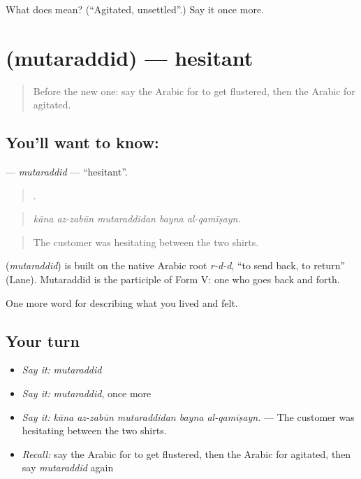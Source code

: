 \begin{tcolorbox}[breakable,colback=teal!4,colframe=teal!35!black,title={Before you move on}]
What does  mean? (\textquotedblleft{}Agitated, unsettled\textquotedblright{}.) Say it once more.
\end{tcolorbox}
\section[\texorpdfstring{\ar{متردد} (mutaraddid)}{متردد (mutaraddid)}]{ (mutaraddid) — hesitant}

\label{lesson:AR-C497-mutaraddid}



\begin{quote}
Before the new one: say the Arabic for to get flustered, then the Arabic for agitated.
\end{quote}

\subsection*{You'll want to know: }
\textbf{} — \emph{mutaraddid} — \textquotedblleft{}hesitant\textquotedblright{}.

\begin{quote}
    .
\end{quote}

\begin{quote}
\emph{kāna az-zabūn mutaraddidan bayna al-qamīṣayn.}
\end{quote}

\begin{quote}
The customer was hesitating between the two shirts.
\end{quote}

\begin{cousinweb}
\textbf{} (\emph{mutaraddid}) is built on the native Arabic root \emph{r-d-d}, \textquotedblleft{}to send back, to return\textquotedblright{} (Lane). Mutaraddid is the participle of Form V: one who goes back and forth.
\end{cousinweb}

\begin{grammarlens}[title={What you've built}]
One more word for describing what you lived and felt.
\end{grammarlens}

\subsection*{Your turn}
\begin{itemize}
\raggedright
  \item \emph{Say it:} \emph{mutaraddid}
  \item \emph{Say it:} \emph{mutaraddid}, once more
  \item \emph{Say it:} \emph{kāna az-zabūn mutaraddidan bayna al-qamīṣayn.} — The customer was hesitating between the two shirts.
  \item \emph{Recall:} say the Arabic for to get flustered, then the Arabic for agitated, then say \emph{mutaraddid} again
\end{itemize}

